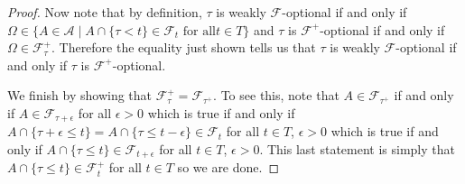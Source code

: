 \begin{proof}
Now note that by definition, $\tau$ is weakly $\mathcal{F}$-optional if and only if
$\Omega \in \lbrace A \in \mathcal{A}
\mid A \cap \lbrace \tau < t \rbrace \in \mathcal{F}_t \text { for all
} t \in T \rbrace$ and $\tau$ is $\mathcal{F}^+$-optional
if and only if $\Omega \in \mathcal{F}^+_\tau$.  Therefore the equality just shown tells us that
$\tau$ is weakly $\mathcal{F}$-optional if and only if $\tau$ is 
$\mathcal{F}^+$-optional.

We finish by showing that $\mathcal{F}^+_\tau =
\mathcal{F}_{\tau^+}$.  To see this, note that $A \in
\mathcal{F}_{\tau^+}$ if and only if $A \in
\mathcal{F}_{\tau + \epsilon}$ for all $\epsilon > 0$ which is true if and only
if $A \cap \lbrace \tau + \epsilon \leq t 
\rbrace =  A \cap \lbrace \tau \leq t - \epsilon
\rbrace\in \mathcal{F}_{t}$ for all $t \in T$, $\epsilon > 0$ which is
true if and only if $A \cap \lbrace \tau \leq t 
\rbrace\in \mathcal{F}_{t+\epsilon}$ for all $t \in T$, $\epsilon >
0$.  This last statement is simply that $A \cap \lbrace \tau \leq t 
\rbrace\in \mathcal{F}^+_t$ for all $t \in T$ so we are done.
\end{proof}

